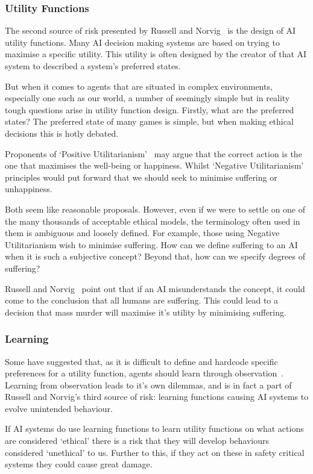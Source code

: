 \documentclass[]{final_report}
\begin{document}
\subsubsection{Utility Functions}
The second source of risk presented by Russell and Norvig~\cite{russell2016artificial} is the design of AI utility functions. Many AI decision making systems are based on trying to maximise a specific utility. This utility is often designed by the creator of that AI system to described a system's preferred states.\par 
But when it comes to agents that are situated in complex environments, especially one such as our world, a number of seemingly simple but in reality tough questions arise in utility function design. Firstly, what are the preferred states? The preferred state of many games is simple, but when making ethical decisions this is hotly debated.\par 
Proponents of `Positive Utilitarianism'~\cite{mill1987utilitarianism} may argue that the correct action is the one that maximises the well-being or happiness. Whilst `Negative Utilitarianism'~\cite{popper1971open} principles would put forward that we should seek to minimise suffering or unhappiness.\par 
Both seem like reasonable proposals. However, even if we were to settle on one of the many thousands of acceptable ethical models, the terminology often used in them is ambiguous and loosely defined. For example, those using Negative Utilitarianism wish to minimise suffering. How can we define suffering to an AI when it is such a subjective concept? Beyond that, how can we specify degrees of suffering?\par 
Russell and Norvig~\cite{russell2016artificial} point out that if an AI misunderstands the concept, it could come to the conclusion that all humans are suffering. This could lead to a decision that mass murder will maximise it's utility by minimising suffering. 

\subsubsection{Learning}
Some have suggested that, as it is difficult to define and hardcode specific preferences for a utility function, agents should learn through observation~\cite{armstrong2015motivated, abel2016reinforcement}. Learning from observation leads to it's own dilemmas, and is in fact a part of Russell and Norvig's third source of risk: learning functions causing AI systems to evolve unintended behaviour.\par 
If AI systems do use learning functions to learn utility functions on what actions are considered `ethical' there is a risk that they will develop behaviours considered `unethical' to us. Further to this, if they act on these in safety critical systems they could cause great damage.
\end{document}
